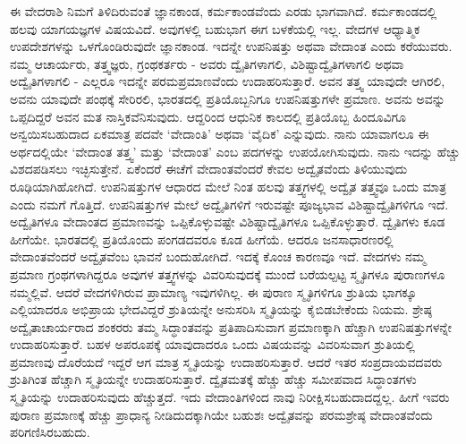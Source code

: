 ಈ ವೇದರಾಶಿ ನಿಮಗೆ ತಿಳಿದಿರುವಂತೆ ಜ್ಞಾನಕಾಂಡ, ಕರ್ಮಕಾಂಡವೆಂದು ಎರಡು ಭಾಗವಾಗಿದೆ. ಕರ್ಮಕಾಂಡದಲ್ಲಿ ಹಲವು ಯಾಗಯಜ್ಞಗಳ ವಿಷಯವಿದೆ. ಅವುಗಳಲ್ಲಿ ಬಹುಭಾಗ ಈಗ ಬಳಕೆಯಲ್ಲಿ ಇಲ್ಲ. ವೇದಗಳ ಆಧ್ಯಾತ್ಮಿಕ ಉಪದೇಶಗಳನ್ನು ಒಳಗೊಂಡಿರುವುದೇ ಜ್ಞಾನಕಾಂಡ. ಇದನ್ನೇ ಉಪನಿಷತ್ತು ಅಥವಾ ವೇದಾಂತ ಎಂದು ಕರೆಯುವರು. ನಮ್ಮ ಆಚಾರ್ಯರು, ತತ್ತ್ವಜ್ಞರು, ಗ್ರಂಥಕರ್ತರು - ಅವರು ದ್ವೈತಿಗಳಾಗಲಿ, ವಿಶಿಷ್ಟಾದ್ವೈತಿಗಳಾಗಲಿ ಅಥವಾ ಅದ್ವೈತಿಗಳಾಗಲಿ - ಎಲ್ಲರೂ ಇದನ್ನೇ ಪರಮಪ್ರಮಾಣವೆಂದು ಉದಾಹರಿಸುತ್ತಾರೆ. ಅವನ ತತ್ತ್ವ ಯಾವುದೇ ಆಗಿರಲಿ, ಅವನು ಯಾವುದೇ ಪಂಥಕ್ಕೆ ಸೇರಿರಲಿ, ಭಾರತದಲ್ಲಿ ಪ್ರತಿಯೊಬ್ಬನಿಗೂ ಉಪನಿಷತ್ತುಗಳೇ ಪ್ರಮಾಣ. ಅವನು ಅವನ್ನು ಒಪ್ಪದಿದ್ದರೆ ಅವನ ಮತ ನಾಸ್ತಿಕವೆನಿಸುವುದು. ಆದ್ದರಿಂದ ಆಧುನಿಕ ಕಾಲದಲ್ಲಿ ಪ್ರತಿಯೊಬ್ಬ ಹಿಂದೂವಿಗೂ ಅನ್ವಯಿಸಬಹುದಾದ ಏಕಮಾತ್ರ ಪದವೇ ‘ವೇದಾಂತಿ’ ಅಥವಾ ‘ವೈದಿಕ’ ಎನ್ನುವುದು. ನಾನು ಯಾವಾಗಲೂ ಈ ಅರ್ಥದಲ್ಲಿಯೇ ‘ವೇದಾಂತ ತತ್ತ್ವ’ ಮತ್ತು ‘ವೇದಾಂತ’ ಎಂಬ ಪದಗಳನ್ನು ಉಪಯೋಗಿಸುವುದು. ನಾನು ಇದನ್ನು ಹೆಚ್ಚು ವಿಶದಪಡಿಸಲು ಇಚ್ಛಿಸುತ್ತೇನೆ. ಏಕೆಂದರೆ ಈಚೆಗೆ ವೇದಾಂತವೆಂದರೆ ಕೇವಲ ಅದ್ವೈತವೆಂದು ತಿಳಿಯುವುದು ರೂಢಿಯಾಗಿಹೋಗಿದೆ. ಉಪನಿಷತ್ತುಗಳ ಆಧಾರದ ಮೇಲೆ ನಿಂತ ಹಲವು ತತ್ತ್ವಗಳಲ್ಲಿ ಅದ್ವೈತ ತತ್ತ್ವವೂ ಒಂದು ಮಾತ್ರ ಎಂದು ನಮಗೆ ಗೊತ್ತಿದೆ. ಉಪನಿಷತ್ತುಗಳ ಮೇಲೆ ಅದ್ವೈತಿಗಳಿಗೆ ಇರುವಷ್ಟೇ ಪೂಜ್ಯಭಾವ ವಿಶಿಷ್ಟಾದ್ವೈತಿಗಳಿಗೂ ಇದೆ. ಅದ್ವೈತಿಗಳೂ ವೇದಾಂತದ ಪ್ರಮಾಣವನ್ನು ಒಪ್ಪಿಕೊಳ್ಳುವಷ್ಟೇ ವಿಶಿಷ್ಟಾದ್ವೈತಿಗಳೂ ಒಪ್ಪಿಕೊಳ್ಳುತ್ತಾರೆ. ದ್ವೈತಿಗಳು ಕೂಡ ಹೀಗೆಯೇ. ಭಾರತದಲ್ಲಿ ಪ್ರತಿಯೊಂದು ಪಂಗಡದವರೂ ಕೂಡ ಹೀಗೆಯೆ. ಆದರೂ ಜನಸಾಧಾರಣರಲ್ಲಿ ವೇದಾಂತವೆಂದರೆ ಅದ್ವೈತವೆಂಬ ಭಾವನೆ ಬಂದುಹೋಗಿದೆ. ಇದಕ್ಕೆ ಕೊಂಚ ಕಾರಣವೂ ಇದೆ. ವೇದಗಳು ನಮ್ಮ ಪ್ರಮಾಣ ಗ್ರಂಥಗಳಾಗಿದ್ದರೂ ಅವುಗಳ ತತ್ತ್ವಗಳನ್ನು ವಿವರಿಸುವುದಕ್ಕೆ ಮುಂದೆ ಬರೆಯಲ್ಪಟ್ಟ ಸ್ಮೃತಿಗಳೂ ಪುರಾಣಗಳೂ ನಮ್ಮಲ್ಲಿವೆ. ಆದರೆ ವೇದಗಳಿಗಿರುವ ಪ್ರಾಮಾಣ್ಯ ಇವುಗಳಿಗಿಲ್ಲ. ಈ ಪುರಾಣ ಸ್ಮೃತಿಗಳಿಗೂ ಶ್ರುತಿಯ ಭಾಗಕ್ಕೂ ಎಲ್ಲಿಯಾದರೂ ಅಭಿಪ್ರಾಯ ಭೇದವಿದ್ದರೆ ಶ್ರುತಿಯನ್ನೇ ಅನುಸರಿಸಿ ಸ್ಮೃತಿಯನ್ನು ಕೈಬಿಡಬೇಕೆಂದು ನಿಯಮ. ಶ್ರೇಷ್ಠ ಅದ್ವೈತಾಚಾರ್ಯರಾದ ಶಂಕರರು ತಮ್ಮ ಸಿದ್ಧಾಂತವನ್ನು ಪ್ರತಿಪಾದಿಸುವಾಗ ಪ್ರಮಾಣಕ್ಕಾಗಿ ಹೆಚ್ಚಾಗಿ ಉಪನಿಷತ್ತುಗಳನ್ನೇ ಉದಾಹರಿಸುತ್ತಾರೆ. ಬಹಳ ಅಪರೂಪಕ್ಕೆ ಯಾವುದಾದರೂ ಒಂದು ವಿಷಯವನ್ನು ವಿವರಿಸುವಾಗ ಶ್ರುತಿಯಲ್ಲಿ ಪ್ರಮಾಣವು ದೊರೆಯದೆ ಇದ್ದರೆ ಆಗ ಮಾತ್ರ ಸ್ಮೃತಿಯನ್ನು ಉದಾಹರಿಸುತ್ತಾರೆ. ಆದರೆ ಇತರ ಸಂಪ್ರದಾಯವದವರು ಶ್ರುತಿಗಿಂತ ಹೆಚ್ಚಾಗಿ ಸ್ಮೃತಿಯನ್ನೇ ಉದಾಹರಿಸುತ್ತಾರೆ. ದ್ವೈತಮತಕ್ಕೆ ಹೆಚ್ಚು ಹೆಚ್ಚು ಸಮೀಪವಾದ ಸಿದ್ಧಾಂತಗಳು ಸ್ಮೃತಿಯನ್ನು ಉದಾಹರಿಸುವುದು ಹೆಚ್ಚುತ್ತದೆ. ಇದು ವೇದಾಂತಿಗಳಿಂದ ನಾವು ನಿರೀಕ್ಷಿಸಬಹುದಾದದ್ದಲ್ಲ. ಹೀಗೆ ಇವರು ಪುರಾಣ ಪ್ರಮಾಣಕ್ಕೆ ಹೆಚ್ಚು ಪ್ರಾಧಾನ್ಯ ನೀಡಿದುದಕ್ಕಾಗಿಯೇ ಬಹುಶಃ ಅದ್ವೈತವನ್ನು ಪರಮಶ್ರೇಷ್ಠ ವೇದಾಂತವೆಂದು ಪರಿಗಣಿಸಿರಬಹುದು.

